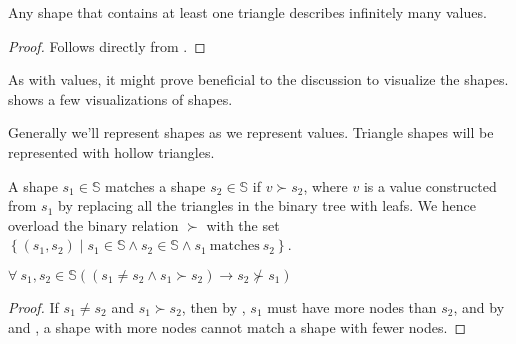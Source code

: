 \begin{lemma} Any shape that contains at least one triangle describes
infinitely many values.\end{lemma}

\begin{proof} Follows directly from .
\end{proof} 

As with values, it might prove beneficial to the discussion to visualize the
shapes.  shows a few visualizations
of shapes. 

\begin{definition} Generally we'll represent shapes as we represent values.
Triangle shapes will be represented with hollow triangles. \end{definition}


\begin{definition}\label{definition:shape-matches-shape} A shape
$s_1\in\mathbb{S}$ matches a shape $s_2\in\mathbb{S}$ if $v\succ s_2$, where
$v$ is a value constructed from $s_1$ by replacing all the triangles in the
binary tree with leafs. We hence overload the binary relation $\succ$ with the
set $\left\{(s_1,s_2)\mid s_1\in\mathbb{S} \wedge s_2\in\mathbb{S} \wedge s_1\
\text{matches}\ s_2\right\}$.\end{definition}

\begin{lemma} $\forall\ s_1, s_2 \in \mathbb{S} \left(\left(s_1\neq s_2 \wedge
s_1\succ s_2\right) \rightarrow s_2\nsucc s_1\right)$\end{lemma}

\begin{proof}If $s_1\neq s_2$ and $s_1\succ s_2$, then by
, $s_1$ must have more nodes than $s_2$,
and by \referToDefinition{value-matches-shape} and
, a shape with more nodes cannot match a
shape with fewer nodes.\end{proof}


